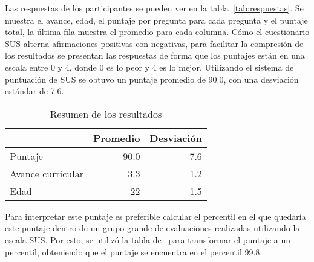 Las respuestas de los participantes se pueden ver en la tabla~\ref{tab:respuestas}. Se muestra el avance, edad, el puntaje por pregunta para cada pregunta y el puntaje total, la última fila muestra el promedio para cada columna.
Cómo el cuestionario SUS alterna afirmaciones positivas con negativas, para facilitar la compresión de los resultados se presentan las respuestas de forma que los puntajes están en una escala entre 0 y 4, donde 0 es lo peor y 4 es lo mejor. Utilizando el sistema de puntuación de SUS se obtuvo un puntaje promedio de 90.0, con una desviación estándar de 7.6.

\begin{table}[hbt]
    \centering
    \caption{Resumen de los resultados}
    \label{tab:resumen-resultados}
    \begin{tabular}{@{}lrr@{}}
    \toprule
                      & \textbf{Promedio} & \textbf{Desviación} \\ \midrule
    Puntaje           & 90.0              & 7.6        \\
    Avance curricular & 3.3               & 1.2        \\
    Edad              & 22                & 1.5        \\ \bottomrule
    \end{tabular}
\end{table}

Para interpretar este puntaje es preferible calcular el percentil en el que quedaría este puntaje dentro de un grupo grande de evaluaciones realizadas utilizando la escala SUS. Por esto, se utilizó la tabla de~\cite{quantifying-the-user-experience} para transformar el puntaje a un percentil, obteniendo que el puntaje se encuentra en el percentil 99.8.

